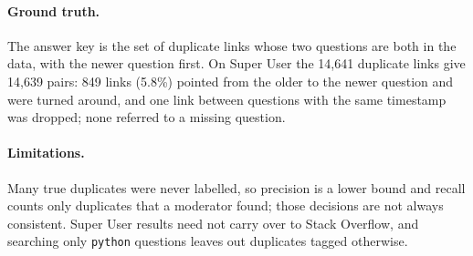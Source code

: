 {\paragraph{Ground truth.} The answer key is the set of duplicate links whose two questions are both
in the data, with the newer question first. On Super User the 14,641 duplicate links give 14,639 pairs:
849 links (5.8\%) pointed from the older to the newer question and were turned around, and one link
between questions with the same timestamp was dropped; none referred to a missing question.

\paragraph{Limitations.} Many true duplicates were never labelled, so precision is a lower bound and
recall counts only duplicates that a moderator found; those decisions are not always consistent.
Super User results need not carry over to Stack Overflow, and searching only \texttt{python}
questions leaves out duplicates tagged otherwise.
}

